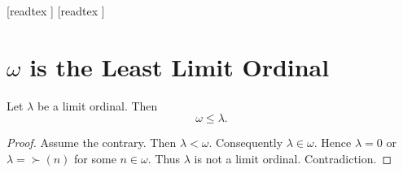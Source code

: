 \documentclass[10pt]{article}
\begin{document}
  \begin{imports}
    \begin{forthel}
      [readtex ]
      [readtex ]
    \end{forthel}
  \end{imports}


  \section*{$\omega$ is the Least Limit Ordinal}

  \begin{forthel}
    \begin{proposition}[id=SET_THEORY_03_5517271459954688,printid]
      Let $\lambda$ be a limit ordinal.
      Then \[ \omega \leq \lambda. \]
    \end{proposition}
    \begin{proof}
      Assume the contrary.
      Then $\lambda < \omega$.
      Consequently $\lambda \in \omega$.
      Hence $\lambda = 0$ or $\lambda = \succ(n)$ for some $n \in \omega$.
      Thus $\lambda$ is not a limit ordinal.
      Contradiction.
    \end{proof}
  \end{forthel}
\end{document}
